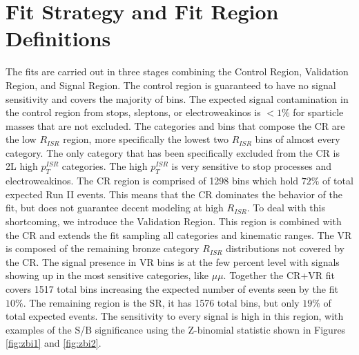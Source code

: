 \section{Fit Strategy and Fit Region Definitions}
The fits are carried out in three stages combining the Control Region, Validation Region, and Signal Region. The control region is guaranteed to have no signal sensitivity and covers the majority of bins. The expected signal contamination in the control region from stops, sleptons, or electroweakinos is $<1\%$ for sparticle masses that are not excluded. The categories and bins that compose the CR are the low $R_{ISR}$ region,  more specifically the lowest two $R_{ISR}$ bins of almost every category. The only category that has been specifically excluded from the CR is 2L high $p_T^{ISR}$ categories. The high $p_T^{ISR}$ is very sensitive to stop processes and electroweakinos. The CR region is comprised of 1298 bins which hold $72\%$ of total expected Run II events. This means that the CR dominates the behavior of the fit, but does not guarantee decent modeling at high $R_{ISR}$. To deal with this shortcoming, we introduce the Validation Region. This region is combined with the CR and extends the fit sampling all categories and kinematic ranges. The VR is composed of the remaining bronze category $R_{ISR}$ distributions not covered by the CR. The signal presence in VR bins is at the few percent level with signals showing up in the most sensitive categories, like $\mu\mu$. Together the CR+VR fit covers 1517 total bins increasing the expected number of events seen by the fit $10\%$. The remaining region is the SR, it has 1576 total bins, but only $19\%$ of total expected events. The sensitivity to every signal is high in this region, with examples of the S/B significance using the Z-binomial statistic shown in Figures \ref{fig:zbi1} and \ref{fig:zbi2}.


